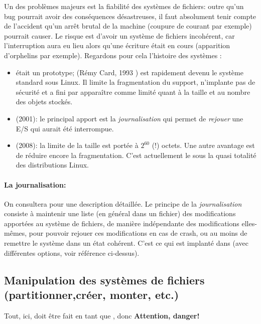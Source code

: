   Un des problèmes majeurs est la fiabilité des systèmes de fichiers:
  outre qu'un bug pourrait avoir des conséquences désastreuses, il
  faut absolument tenir compte de l'accident qu'un arrêt brutal de la
  machine (coupure de courant par exemple) pourrait causer. Le risque
  est d'avoir un
  système de fichiers incohérent, car l'interruption aura eu lieu
  alors qu'une écriture était en cours (apparition d'orphelins  par
  exemple). Regardons pour cela l'histoire des systèmes 
  :
  \begin{itemize}
    \item {} était un prototype;  (Rémy Card, 1993
      \cite{rcard}) 
      est rapidement devenu le système standard sous Linux. Il limite
      la fragmentation 
      du support, n'implante pas de sécurité et a fini par apparaître
      comme limité quant à la taille et au nombre des objets stockés.
    \item {} (2001): le principal apport est la \emph{journalisation}
      qui permet de \emph{rejouer} une E/S qui aurait été interrompue.
    \item {} (2008): la limite de la taille est portée à
      $2^{60}$ (!) octets. Une autre avantage est de réduire encore la
      fragmentation. C'est actuellement le \sff{} sous la
      quasi totalité des distributions Linux. 
  \end{itemize}
  
\paragraph{La journalisation:} On consultera \cite{journ} pour une
description détaillée.
Le principe de la \emph{journalisation} consiste à maintenir une liste
(en général dans un fichier) des modifications apportées au système de
fichiers, de manière indépendante des modifications elles-mêmes, pour
pouvoir rejouer ces modifications en cas de crash, ou au moins de
remettre le système dans un état cohérent. C'est ce qui est implanté
dans  (avec différentes options, voir référence ci-dessus).  

\subsection{Manipulation des systèmes de fichiers (partitionner,créer, monter,
  etc.)}
Tout, ici, doit être fait en tant que , donc 
\textdbend \textbf{Attention, danger!}


